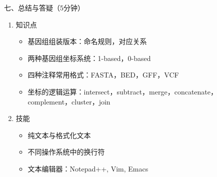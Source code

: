 \documentclass{TIJMUjiaoanLL}
\begin{document}
\vspace*{0.2cm}
\noindent
七、总结与答疑（5分钟）
\begin{enumerate}
  \item 知识点
    \begin{itemize}
      \item 基因组组装版本：命名规则，对应关系
      \item 两种基因组坐标系统：1-based，0-based
      \item 四种注释常用格式：FASTA，BED，GFF，VCF
      \item 坐标的逻辑运算：intersect，subtract，merge，concatenate，complement，cluster，join
    \end{itemize}
  \item 技能
    \begin{itemize}
      \item 纯文本与格式化文本
      \item 不同操作系统中的换行符
      \item 文本编辑器：Notepad++, Vim, Emacs
    \end{itemize}
\end{enumerate}


\otherTail
\end{document}
